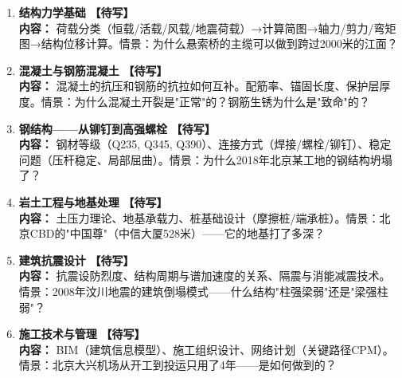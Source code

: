\documentclass[a4paper,11pt]{ctexart}
\newcommand{\draft}{\textcolor{orange!80!black}{\textbf{【待写】}}}
\begin{document}
\begin{enumerate}
\item[\textbf{第1课}] \textbf{结构力学基础} \draft \\
\textbf{内容：} 荷载分类（恒载/活载/风载/地震荷载）→计算简图→轴力/剪力/弯矩图→结构位移计算。情景：为什么悬索桥的主缆可以做到跨过2000米的江面？
\item[\textbf{第2课}] \textbf{混凝土与钢筋混凝土} \draft \\
\textbf{内容：} 混凝土的抗压和钢筋的抗拉如何互补。配筋率、锚固长度、保护层厚度。情景：为什么混凝土开裂是"正常"的？钢筋生锈为什么是"致命"的？
\item[\textbf{第3课}] \textbf{钢结构——从铆钉到高强螺栓} \draft \\
\textbf{内容：} 钢材等级（Q235, Q345, Q390）、连接方式（焊接/螺栓/铆钉）、稳定问题（压杆稳定、局部屈曲）。情景：为什么2018年北京某工地的钢结构坍塌了？
\item[\textbf{第4课}] \textbf{岩土工程与地基处理} \draft \\
\textbf{内容：} 土压力理论、地基承载力、桩基础设计（摩擦桩/端承桩）。情景：北京CBD的"中国尊"（中信大厦528米）——它的地基打了多深？
\item[\textbf{第5课}] \textbf{建筑抗震设计} \draft \\
\textbf{内容：} 抗震设防烈度、结构周期与谱加速度的关系、隔震与消能减震技术。情景：2008年汶川地震的建筑倒塌模式——什么结构"柱强梁弱"还是"梁强柱弱"？
\item[\textbf{第6课}] \textbf{施工技术与管理} \draft \\
\textbf{内容：} BIM（建筑信息模型）、施工组织设计、网络计划（关键路径CPM）。情景：北京大兴机场从开工到投运只用了4年——是如何做到的？
\end{enumerate}
\end{document}
